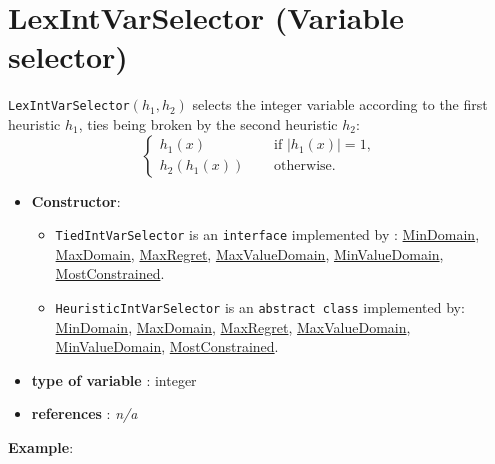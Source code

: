 \section{LexIntVarSelector (Variable selector)}\label{lexintvarselector:lexintvarselectorvarselector}\hypertarget{lexintvarselector:lexintvarselectorvarselector}{}
\begin{notedef}
  \texttt{LexIntVarSelector}$(h_1,h_2)$ selects the integer variable according to the first heuristic $h_1$, ties being broken by the second heuristic $h_2$:
$$\begin{cases}
  h_1(x) &\quad\text{ if } |h_1(x)|=1,\\
  h_2(h_1(x)) &\quad\text{ otherwise}.
\end{cases}$$
\end{notedef}

\begin{itemize}
	\item \textbf{Constructor}: 
	\begin{itemize}
\item \texttt{TiedIntVarSelector} is an \texttt{interface} implemented by : \hyperlink{mindomain:mindomainvarselector}{MinDomain}, \hyperlink{maxdomain:maxdomainvarselector}{MaxDomain}, \hyperlink{maxregret:maxregretvarselector}{MaxRegret}, \hyperlink{maxvaldomain:maxvaldomainvarselector}{MaxValueDomain}, \hyperlink{minvaldomain:minvaldomainvarselector}{MinValueDomain}, \hyperlink{mostconstrained:mostconstrainedvarselector}{MostConstrained}. 
\item \texttt{HeuristicIntVarSelector} is an \texttt{abstract class}  implemented by: \hyperlink{mindomain:mindomainvarselector}{MinDomain}, \hyperlink{maxdomain:maxdomainvarselector}{MaxDomain}, \hyperlink{maxregret:maxregretvarselector}{MaxRegret}, \hyperlink{maxvaldomain:maxvaldomainvarselector}{MaxValueDomain}, \hyperlink{minvaldomain:minvaldomainvarselector}{MinValueDomain}, \hyperlink{mostconstrained:mostconstrainedvarselector}{MostConstrained}. 
\end{itemize}
	\item \textbf{type of variable} : integer
	\item \textbf{references} : \emph{n/a}
\end{itemize}

\textbf{Example}:
%

